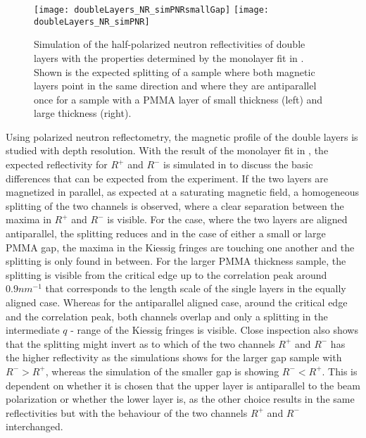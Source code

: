 \documentclass[\main/dresen_thesis.tex]{subfiles}
\begin{document}
  \label{sec:doubleLayers:pnr}
  
  \begin{figure}[tb]
    \centering
    \texttt{[image: doubleLayers\_NR\_simPNRsmallGap]}
    \texttt{[image: doubleLayers\_NR\_simPNR]}
    \caption{\label{fig:doubleLayers:pnrSimulation}Simulation of the half-polarized neutron reflectivities of double layers with the properties determined by the monolayer fit in . Shown is the expected splitting of a sample where both magnetic layers point in the same direction and where they are antiparallel once for a sample with a PMMA layer of small thickness (left) and large thickness (right).}
  \end{figure}

  Using polarized neutron reflectometry, the magnetic profile of the double layers is studied with depth resolution.
  With the result of the monolayer fit in , the expected reflectivity for $R^{+}$ and $R^{-}$ is simulated in  to discuss the basic differences that can be expected from the experiment.
  If the two layers are magnetized in parallel, as expected at a saturating magnetic field, a homogeneous splitting of the two channels is observed, where a clear separation between the maxima in $R^{+}$ and $R^{-}$ is visible.
  For the case, where the two layers are aligned antiparallel, the splitting reduces and in the case of  either a small or large PMMA gap, the maxima in the Kiessig fringes are touching one another and the splitting is only found in between.
  For the larger PMMA thickness sample, the splitting is visible from the critical edge up to the correlation peak around $0.9 \unit{nm^{-1}}$ that corresponds to the length scale of the single layers in the equally aligned case.
  Whereas for the antiparallel aligned case, around the critical edge and the correlation peak, both channels overlap and only a splitting in the intermediate $q$ - range of the Kiessig fringes is visible.
  Close inspection also shows that the splitting might invert as to which of the two channels $R^{+}$ and $R^{-}$ has the higher reflectivity as the simulations shows for the larger gap sample with $R^{-} > R^{+}$, whereas the simulation of the smaller gap is showing $R^{-} < R^{+}$.
  This is dependent on whether it is chosen that the upper layer is antiparallel to the beam polarization or whether the lower layer is, as the other choice results in the same reflectivities but with the behaviour of the two channels $R^{+}$ and $ R^{-}$ interchanged.
  \\
\end{document}
